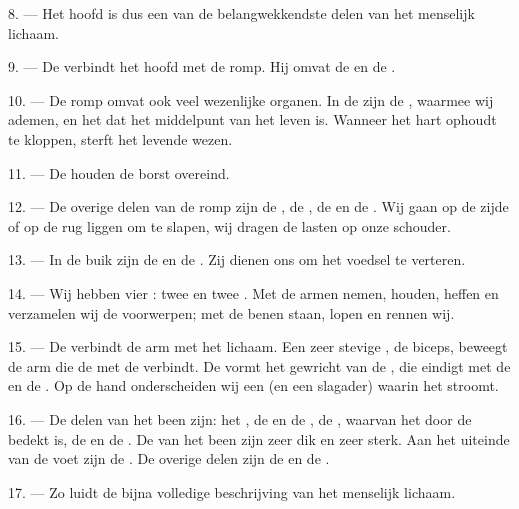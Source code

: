 8. --- Het hoofd is dus een van de belangwekkendste delen van het menselijk lichaam.

\VUsaut{4.4mm}
\VUsaut{3.0mm}

9. --- De  verbindt het hoofd met de romp. Hij omvat de
 en de .

10. --- De romp omvat ook veel wezenlijke organen. In de  zijn de
, waarmee wij ademen, en het  dat het middelpunt van
het leven is. Wanneer het hart ophoudt te kloppen, sterft het levende wezen.

11. --- De  houden de borst overeind.

12. --- De overige delen van de romp zijn de , de , de
 en de . Wij gaan op de zijde of op de rug liggen
om te slapen, wij dragen de lasten op onze schouder.

13. --- In de buik zijn de  en de . Zij dienen ons om het voedsel
te verteren.

\VUsaut{4.4mm}
\VUsaut{3.0mm}

14. --- Wij hebben vier : twee  en twee
. Met de armen nemen, houden, heffen en verzamelen wij de
voorwerpen; met de benen staan, lopen en rennen wij.

15. --- De  verbindt de arm met het lichaam. Een zeer stevige
, de biceps, beweegt de arm die de  met de
 verbindt. De  vormt het gewricht van de
, die eindigt met de  en de . Op de
hand onderscheiden wij een  (en een slagader) waarin het
 stroomt.

16. --- De delen van het been zijn: het , de  en de
, de , waarvan het  door de
 bedekt is, de  en de . De
 van het been zijn zeer dik en zeer sterk. Aan het uiteinde
van de voet zijn de . De overige delen zijn de  en de
.

17. --- Zo luidt de bijna volledige beschrijving van het menselijk lichaam.

